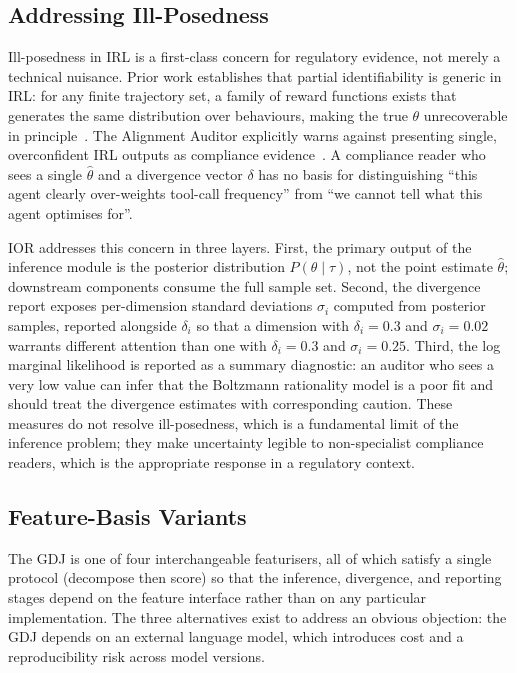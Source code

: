 \subsection{Addressing Ill-Posedness}

Ill-posedness in IRL is a first-class concern for regulatory evidence, not merely a
technical nuisance. Prior work establishes that partial identifiability is generic
in IRL: for any finite trajectory set, a family of reward functions exists that
generates the same distribution over behaviours, making the true $\theta$
unrecoverable in principle~\citep{partialIdentifiability2024}. The Alignment
Auditor explicitly warns against presenting single, overconfident IRL outputs as
compliance evidence~\citep{alignmentAuditor2025}. A compliance reader who sees a
single $\hat{\theta}$ and a divergence vector $\delta$ has no basis for
distinguishing ``this agent clearly over-weights tool-call frequency'' from ``we
cannot tell what this agent optimises for''.

IOR addresses this concern in three layers. First, the primary output of the
inference module is the posterior distribution $P(\theta \mid \tau)$, not the point
estimate $\hat{\theta}$; downstream components consume the full sample set. Second,
the divergence report exposes per-dimension standard deviations $\sigma_i$
computed from posterior samples, reported alongside $\delta_i$ so that a dimension
with $\delta_i = 0.3$ and $\sigma_i = 0.02$ warrants different attention than one
with $\delta_i = 0.3$ and $\sigma_i = 0.25$. Third, the log marginal likelihood is
reported as a summary diagnostic: an auditor who sees a very low value can infer
that the Boltzmann rationality model is a poor fit and should treat the divergence
estimates with corresponding caution. These measures do not resolve ill-posedness,
which is a fundamental limit of the inference problem; they make uncertainty
legible to non-specialist compliance readers, which is the appropriate response in
a regulatory context.

\subsection{Feature-Basis Variants}
\label{subsec:variants}

The GDJ is one of four interchangeable featurisers, all of which satisfy a single
protocol (decompose then score) so that the inference, divergence, and reporting
stages depend on the feature interface rather than on any particular
implementation. The three alternatives exist to address an obvious objection: the
GDJ depends on an external language model, which introduces cost and a
reproducibility risk across model versions.

